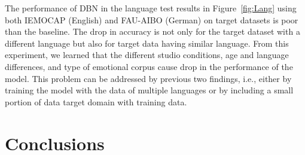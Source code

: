 \documentclass[a4paper]{article}
\newcommand*{\JE}[1]{\textcolor{magenta}{#1}}
\begin{document}
The performance of DBN in the language test results in Figure~\ref{fig:Lang} using both IEMOCAP (English) and FAU-AIBO (German) on target datasets is poor than the baseline. The drop in accuracy is not only for the target dataset with a different language but also for target data having similar language. From this experiment, we learned that the different studio conditions, age and language differences, and type of emotional corpus cause drop in the performance of the model. This problem can be addressed by previous two findings, i.e., either by training the model with the data of multiple languages or by including a small portion of data target domain with training data. 





\section{Conclusions}
\label{sec: con}
\end{document}
